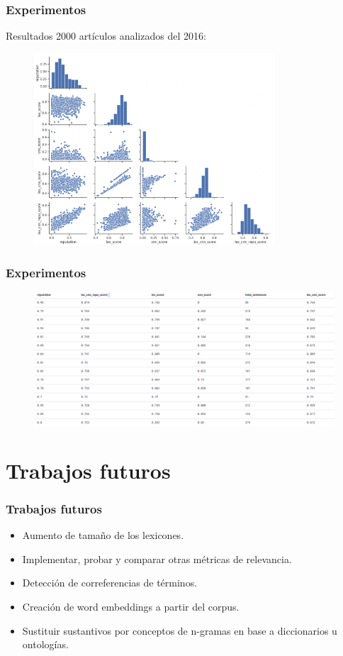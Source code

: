 \documentclass[10pt,fleqn]{beamer}
\begin{document}
\begin{frame} \frametitle{Experimentos} 

Resultados 2000 artículos analizados del 2016:
\begin{figure}  \centering
  \includegraphics[width=9cm, keepaspectratio]{images/2016_results_mod.png}
\end{figure}

\end{frame}



\begin{frame} \frametitle{Experimentos} 

\begin{figure}  \centering
  \includegraphics[width=12.5cm, keepaspectratio]{images/kib1.png}
\end{figure}

\end{frame}

\section{Trabajos futuros}
\begin{frame} \frametitle{Trabajos futuros} 
\begin{itemize}
\item Aumento de tamaño de los lexicones.
\item Implementar, probar y comparar otras métricas de relevancia.
\item Detección de correferencias de términos.
\item Creación de word embeddings a partir del corpus.
\item Sustituir sustantivos por conceptos de n-gramas en base a diccionarios u ontologías.

\end{itemize}
\end{frame}
\end{document}
